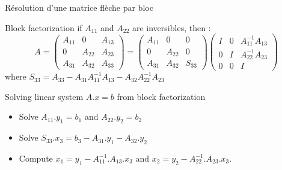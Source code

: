 \documentclass[compress,10pt,aspectratio=169]{beamer}
\begin{document}
\begin{frame}[fragile]{Résolution d'une matrice flèche par bloc}
  \scriptsize
  \begin{block}{\small Block factorization}
    if $A_{11}$ and $A_{22}$ are inversibles, then :
    \[
      A = \left(\begin{array}{ccc}
        A_{11} & 0 & A_{13} \\
          0    & A_{22} & A_{23} \\
          A_{31} & A_{32} & A_{33}
    \end{array}\right)
    = 
    \left(\begin{array}{ccc}
      A_{11} & 0 & 0 \\
        0    & A_{22} & 0 \\
        A_{31} & A_{32} & S_{33}
  \end{array}\right)
  \left(\begin{array}{ccc}
    I & 0 & A_{11}^{-1}A_{13} \\
      0    & I & A_{22}^{-1}A_{23} \\
      0 & 0 & I
\end{array}\right)    
    \]
    where $S_{33} = A_{33} - A_{31}A_{11}^{-1}A_{13} - A_{32}A_{22}^{-1}A_{23}$
  \end{block}

  \begin{block}{\small Solving linear system $A.x=b$ from block factorization}
    \begin{itemize}
      \item Solve $A_{11}.y_{1} = b_{1}$ and $A_{22}.y_{2} = b_{2}$
      \item Solve $S_{33}.x_{3} = b_{3} - A_{31}.y_{1} -A_{32}.y_{2}$
      \item Compute $x_{1} = y_{1} - A_{11}^{-1}.A_{13}.x_{3}$ and $x_{2} = y_{2} - A_{22}^{-1}.A_{23}.x_{3}$.
    \end{itemize}
  \end{block}
\end{frame}
\end{document}
